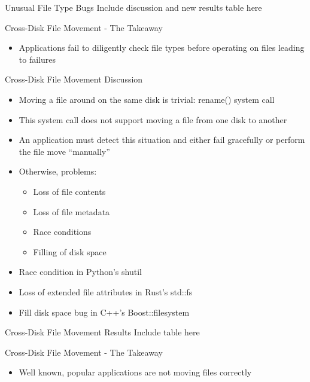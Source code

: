 \documentclass[pdf]{beamer}
\begin{document}
\begin{frame}{Unusual File Type Bugs}
  Include discussion and new results table here
\end{frame}


\begin{frame}{Cross-Disk File Movement - The Takeaway}
  \begin{itemize}
    \item{Applications fail to diligently check file types before operating
      on files leading to failures}
  \end{itemize}
\end{frame}


\begin{frame}{Cross-Disk File Movement Discussion}
  \begin{itemize}
  \item{Moving a file around on the same disk is trivial: rename() system
      call}
  \item{This system call does not support moving a file from one disk to
      another}
  \item{An application must detect this situation and either fail
      gracefully or perform the file move ``manually''}
  \item{Otherwise, problems:}
    \begin{itemize}
    \item{Loss of file contents}
    \item{Loss of file metadata}
    \item{Race conditions}
    \item{Filling of disk space}
    \end{itemize}
  \item{Race condition in Python's shutil}
  \item{Loss of extended file attributes in Rust's std::fs}
  \item{Fill disk space bug in C++'s Boost::filesystem}
  \end{itemize}
\end{frame}


\begin{frame}{Cross-Disk File Movement Results}
  Include table here
\end{frame}


\begin{frame}{Cross-Disk File Movement - The Takeaway}
  \begin{itemize}
    \item{Well known, popular applications are not moving files correctly}
  \end{itemize}
\end{frame}
\end{document}
